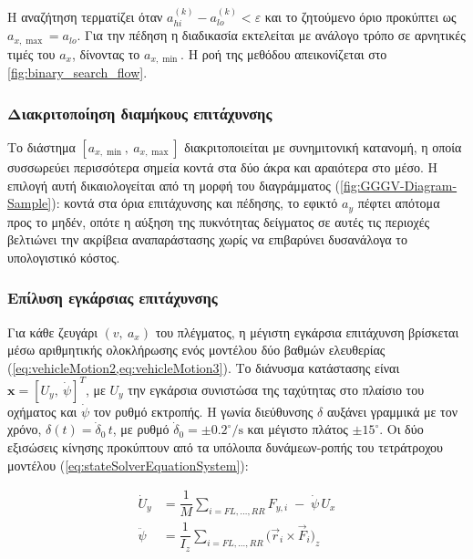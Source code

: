 \noindent
Η αναζήτηση τερματίζει όταν $a_{hi}^{(k)} - a_{lo}^{(k)} < \varepsilon$ και το ζητούμενο
όριο προκύπτει ως $a_{x,\max} = a_{lo}$. Για την πέδηση η διαδικασία εκτελείται με ανάλογο
τρόπο σε αρνητικές τιμές του $a_x$, δίνοντας το $a_{x,\min}$. Η ροή της μεθόδου
απεικονίζεται στο \cref{fig:binary_search_flow}.\\[10pt]




\subsubsection{Διακριτοποίηση διαμήκους επιτάχυνσης}

Το διάστημα $[a_{x,\min},\ a_{x,\max}]$ διακριτοποιείται με συνημιτονική κατανομή, η
οποία συσσωρεύει περισσότερα σημεία κοντά στα δύο άκρα και αραιότερα στο μέσο. Η επιλογή
αυτή δικαιολογείται από τη μορφή του διαγράμματος (\ref{fig:GGGV-Diagram-Sample}): κοντά στα όρια επιτάχυνσης και πέδησης,
το εφικτό $a_y$ πέφτει απότομα προς το μηδέν, οπότε η αύξηση της πυκνότητας δείγματος
σε αυτές τις περιοχές βελτιώνει την ακρίβεια αναπαράστασης χωρίς να επιβαρύνει
δυσανάλογα το υπολογιστικό κόστος.\\[10pt]


\subsubsection{Επίλυση εγκάρσιας επιτάχυνσης}

Για κάθε ζευγάρι $(v,\ a_x)$ του πλέγματος, η μέγιστη εγκάρσια επιτάχυνση βρίσκεται μέσω
αριθμητικής ολοκλήρωσης ενός μοντέλου δύο βαθμών ελευθερίας (\cref{eq:vehicleMotion2,eq:vehicleMotion3}). Το διάνυσμα κατάστασης
είναι $\mathbf{x} = [U_y,\ \dot{\psi}]^T$, με $U_y$ την εγκάρσια συνιστώσα της ταχύτητας
στο πλαίσιο του οχήματος και $\dot{\psi}$ τον ρυθμό εκτροπής. Η γωνία διεύθυνσης
$\delta$ αυξάνει γραμμικά με τον χρόνο, $\delta(t) = \dot{\delta}_0\,t$, με ρυθμό
$\dot{\delta}_0 = \pm 0.2^\circ/\mathrm{s}$ και μέγιστο πλάτος $\pm 15^\circ$. Οι δύο
εξισώσεις κίνησης προκύπτουν από τα υπόλοιπα δυνάμεων-ροπής του τετράτροχου μοντέλου
(\cref{eq:stateSolverEquationSystem}):

\begin{equation}
    \begin{aligned}
        \dot{U}_y &= \dfrac{1}{M}\sum_{i=FL,\dots,RR} F_{y,i} \; - \; \dot{\psi}\,U_x \\[3pt]
        \ddot{\psi} &= \dfrac{1}{I_z}\sum_{i=FL,\dots,RR}\bigl(\vec{r}_i \times \vec{F}_i\bigr)_z
    \end{aligned}
    \label{eq:ggvOde}
\end{equation}

